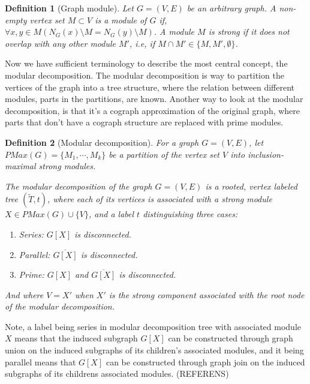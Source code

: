 \documentclass{amsart}
\newtheorem{definition}{Definition}[section]
\begin{document}
\begin{definition}[Graph module]
    Let $G = (V,E)$ be an arbitrary graph. A non-empty vertex set $M \subset V$
    is a module of $G$ if, $\forall x,y \in M (N_G(x) \setminus M = N_G(y) \setminus M)  $. A module $M$ is
    strong if it does not overlap with any other module $M'$, i.e, if 
    $M \cap M' \in \{M,M',\emptyset \}$.
\end{definition}
  

Now we have sufficient terminology to describe the most central concept, the
modular decomposition. The modular decomposition is way to partition the
vertices of the graph into a tree structure, where the relation between
different modules, parts in the partitions, are known. Another way to look at
the modular decomposition, is that it's a cograph approximation of the original
graph, where parts that don't have a cograph structure are replaced with prime
modules.

\begin{definition}[Modular decomposition]
    For a graph $G = (V,E)$, let $PMax(G) = \{M_1,\cdots,M_k\}$ be a partition of the vertex set $V$ 
    into inclusion-maximal strong modules.
    
    The modular decomposition of the graph $G = (V,E)$ is a rooted, vertex labeled tree
    $(\widetilde{T},t)$, where each of its vertices is associated with a strong
    module $X \in PMax(G) \cup \{V\}$, and a label $t$ distinguishing  three cases:

    \begin{enumerate}
        \item Series: $G[X]$ is disconnected.
        \item Parallel: $\overline{G[X]}$ is disconnected.
        \item Prime: $G[X]$ and $\overline{G[X]}$ is disconnected.
    \end{enumerate}

    And where $V = X'$ when $X'$ is the strong component associated with the
    root node of the modular decomposition.
\end{definition}

Note, a label being series in modular decomposition tree with associated module
$X$ means that the induced subgraph $G[X]$ can be constructed through graph
union on the induced subgraphs of its children's associated modules, and it being
parallel means that $G[X]$ can be constructed through graph join on the
induced subgraphs of its childrens associated modules. (REFERENS)
\end{document}
